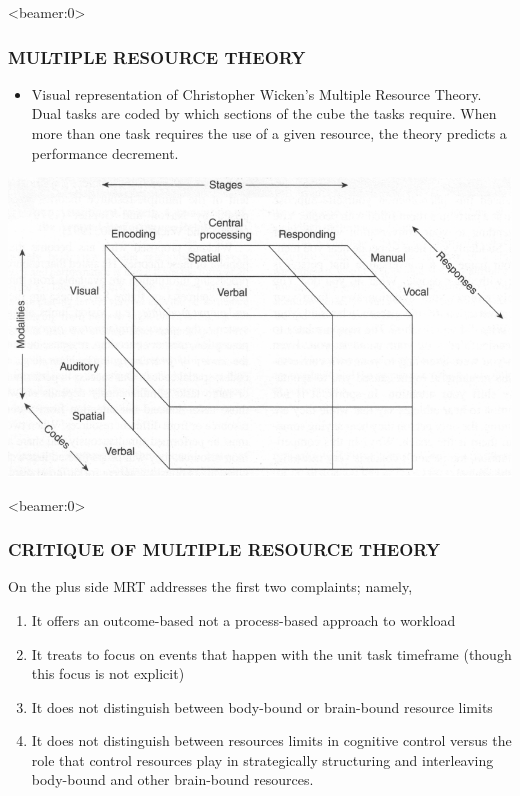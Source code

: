 \documentclass{beamer}
\begin{document}
\begin{frame}<beamer:0>
	\frametitle{MULTIPLE RESOURCE THEORY}
	\begin{itemize}
		\item Visual representation of Christopher Wicken's Multiple Resource Theory. Dual tasks are coded by which sections of the cube the tasks require. When more than one task requires the use of a given resource, the theory predicts a performance decrement.
	\end{itemize}
	\begin{center}
		\includegraphics[width=.75\textwidth]{../zNvBkFigs/wickens-mrt}
	\end{center}
\end{frame}

\begin{frame}<beamer:0>
	\frametitle{CRITIQUE OF MULTIPLE RESOURCE THEORY}
On the plus side MRT addresses the first two complaints; namely,
	\begin{enumerate}
		\item It offers an outcome-based not a process-based approach to workload
		\item It treats to focus on events that happen with the unit task timeframe (though this focus is not explicit)
	\pause
		\item It does not distinguish between body-bound or brain-bound resource limits
		\item It does not distinguish between resources limits in cognitive control versus the role that control resources play in strategically structuring and interleaving body-bound and other brain-bound resources.
	\end{enumerate}
\end{frame}
\end{document}
